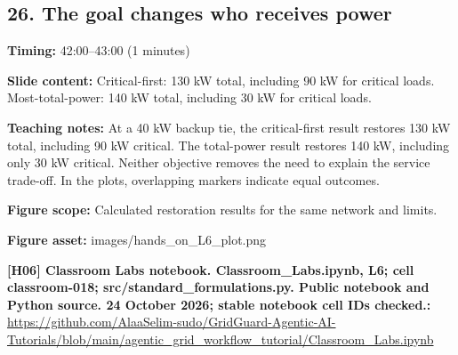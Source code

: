 \documentclass[10pt,letterpaper]{article}
\begin{document}
\subsection*{26. The goal changes who receives power}
\textbf{Timing:} 42:00--43:00 (1 minutes)\par
\textbf{Slide content:} Critical-first: 130 kW total, including 90 kW for critical loads.
Most-total-power: 140 kW total, including 30 kW for critical loads.\par
\textbf{Teaching notes:} At a 40 kW backup tie, the critical-first result restores 130 kW total, including 90 kW critical. The total-power result restores 140 kW, including only 30 kW critical. Neither objective removes the need to explain the service trade-off. In the plots, overlapping markers indicate equal outcomes.\par
\textbf{Figure scope:} Calculated restoration results for the same network and limits.\par
\textbf{Figure asset:} images/hands\_on\_L6\_plot.png\par
\textbf{[H06] Classroom Labs notebook. Classroom\_Labs.ipynb, L6; cell classroom-018; src/standard\_formulations.py. Public notebook and Python source. 24 October 2026; stable notebook cell IDs checked.:} \href{https://github.com/AlaaSelim-sudo/GridGuard-Agentic-AI-Tutorials/blob/main/agentic_grid_workflow_tutorial/Classroom_Labs.ipynb}{\small\ttfamily https:/\allowbreak{}/\allowbreak{}github.\allowbreak{}com/\allowbreak{}AlaaSelim-\allowbreak{}sudo/\allowbreak{}GridGuard-\allowbreak{}Agentic-\allowbreak{}AI-\allowbreak{}Tutorials/\allowbreak{}blob/\allowbreak{}main/\allowbreak{}agentic\_\allowbreak{}grid\_\allowbreak{}workflow\_\allowbreak{}tutorial/\allowbreak{}Classroom\_\allowbreak{}Labs.\allowbreak{}ipynb}\par
\par\medskip
\end{document}
